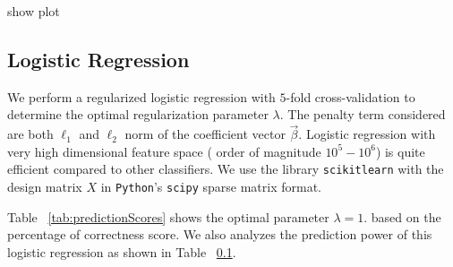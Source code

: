 \documentclass[conference]{IEEEtran}
\newcommand{\col}[1]{\textcolor{awesome}{#1}}
\begin{document}
\col{show plot}


\subsection{Logistic Regression}

We perform a regularized logistic regression with $5$-fold cross-validation to determine the optimal regularization parameter $\lambda$. The penalty term considered are both $\ell_1$ and $\ell_2$ norm of the coefficient vector $\vec{\beta}$. Logistic regression with very high dimensional feature space ( order of magnitude $10^5 - 10^6$) is quite efficient compared to other classifiers. We use the library {\tt scikitlearn} with the design matrix $X$ in  {\tt Python}'s {\tt scipy} sparse matrix format.




Table ~\ref{tab:predictionScores} shows the optimal parameter \col{$\lambda = 1$. } based on the percentage of correctness score.  We also analyzes the prediction power of this logistic regression as shown in Table ~\ref{}. 
\end{document}

